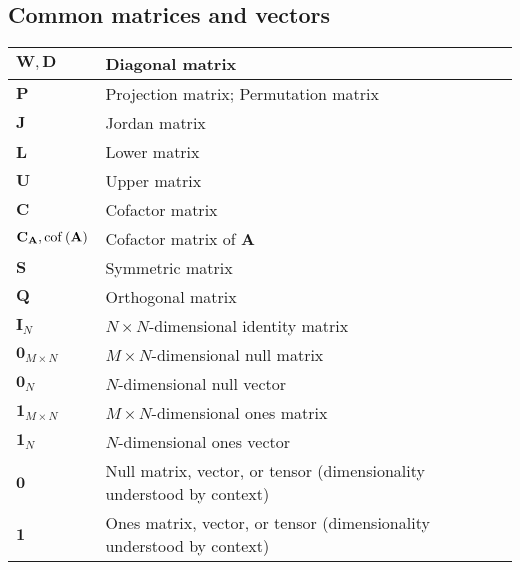 \documentclass{article}
\begin{document}
\subsection{Common matrices and vectors}
\begin{xltabular}{\textwidth}{XX}
    \(\mathbf{W}, \mathbf{D}\) & Diagonal matrix \\ \hline
    \(\mathbf{P}\) & Projection matrix; Permutation matrix \\ \hline
    \(\mathbf{J}\) & Jordan matrix \\ \hline
    \(\mathbf{L}\) & Lower matrix\\ \hline
    \(\mathbf{U}\) & Upper matrix\\ \hline
    \(\mathbf{C}\) & Cofactor matrix\\ \hline
    \(\mathbf{C}_\mathbf{A}, \operatorname{cof}\left(\mathbf{A}\right)\) & Cofactor matrix of \(\mathbf{A}\)\\ \hline
    \(\mathbf{S}\) & Symmetric matrix\\ \hline
    \(\mathbf{Q}\) & Orthogonal matrix\\ \hline
    \(\mathbf{I}_N\) & \(N\times N\)-dimensional identity matrix\\ \hline
    \(\mathbf{0}_{M\times N}\) & \(M\times N\)-dimensional null matrix\\ \hline
    \(\mathbf{0}_{N}\) & \(N\)-dimensional null vector\\ \hline
    \(\mathbf{1}_{M\times N}\) & \(M\times N\)-dimensional ones matrix\\ \hline
    \(\mathbf{1}_{N}\) & \(N\)-dimensional ones vector\\ \hline
    \(\mathbf{0}\) & Null matrix, vector, or tensor (dimensionality understood by context)\\ \hline
    \(\mathbf{1}\) & Ones matrix, vector, or tensor (dimensionality understood by context)\\
\end{xltabular}
\end{document}
